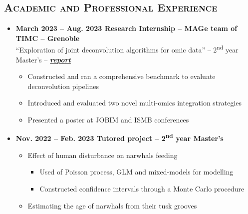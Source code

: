 \documentclass{article}
\begin{document}
\begin{minipage}{0.8\textwidth}
\begin{flushleft}
    \section*{\textsc{Academic and Professional Experience}}
    \begin{itemize}
        \item \textbf{March 2023 – Aug. 2023 \qquad Research Internship – MAGe team of TIMC – Grenoble} \\
        “Exploration of joint deconvolution algorithms for omic data” – 2\textsuperscript{nd} year Master’s – \textbf{\textit{ \href{https://vadmbertr.github.io/Exploration-of-joint-deconvolution-algorithms-for-omic-data/M2_Internship_report__Exploration_of_joint_deconvolution_algorithms_for_omic_data.pdf}{report}}}
        \vspace{-.15cm}
        \begin{itemize}[leftmargin=*]
        \setlength\itemsep{.01cm}
            \item Constructed and ran a comprehensive benchmark to evaluate deconvolution pipelines
            \item Introduced and evaluated two novel multi-omics integration strategies
            \item Presented a poster at JOBIM and ISMB conferences
        \end{itemize}
        \item \textbf{Nov. 2022 – Feb. 2023 \qquad Tutored project – 2\textsuperscript{nd} year Master’s}
        \vspace{-.15cm}
        \begin{itemize}[leftmargin=*]
        \setlength\itemsep{.01cm}
            \item Effect of human disturbance on narwhals feeding
            \vspace{-.15cm}
            \begin{itemize}[leftmargin=*]
            \setlength\itemsep{.01cm}
                \item Used of Poisson process, GLM and mixed-models for modelling
                \item Constructed confidence intervals through a Monte Carlo procedure
            \end{itemize}
            \item Estimating the age of narwhals from their tusk grooves
            \vspace{-.15cm}
            \begin{itemize}[leftmargin=*]
            \setlength\itemsep{.01cm}

\end{itemize}
\end{itemize}
\end{itemize}
\end{flushleft}
\end{minipage}
\end{document}

